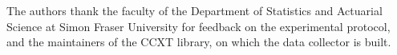 \documentclass[sigconf]{acmart}
\begin{document}


\begin{acks}
The authors thank the faculty of the Department of Statistics and Actuarial
Science at Simon Fraser University for feedback on the experimental protocol,
and the maintainers of the CCXT library, on which the data collector is built.
\end{acks}



\end{document}
